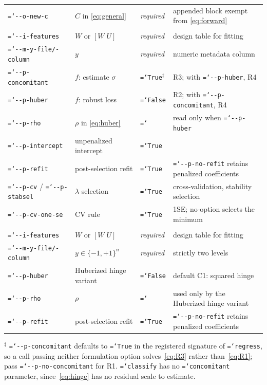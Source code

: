 \documentclass[11pt,a4paper]{article}
\newcommand{\code}[1]{\allowbreak\texttt{\hyphenchar\font=`\-\relax #1}}
\begin{document}
\begin{table}[htbp]
\begin{tabular}{@{}llll@{}}
\code{-{}-o-new-c} & $C$ in \eqref{eq:general} & \textit{required} & appended block exempt from \eqref{eq:forward} \\
\addlinespace
\multicolumn{4}{@{}l}{\textit{\code{classo regress}}} \\
\code{-{}-i-features} & $W$ or $[W\;U]$ & \textit{required} & design table for fitting \\
\code{-{}-m-y-file/-column} & $y$ & \textit{required} & numeric metadata column \\
\code{-{}-p-concomitant} & $f$: estimate $\sigma$ & \code{True}$^{\ddagger}$ & R3; with \code{-{}-p-huber}, R4 \\
\code{-{}-p-huber} & $f$: robust loss & \code{False} & R2; with \code{-{}-p-concomitant}, R4 \\
\code{-{}-p-rho} & $\rho$ in \eqref{eq:huber} & \code{1.345} & read only when \code{-{}-p-huber} \\
\code{-{}-p-intercept} & unpenalized intercept & \code{True} & \\
\code{-{}-p-refit} & post-selection refit & \code{True} & \code{-{}-p-no-refit} retains penalized coefficients \\
\code{-{}-p-cv} / \code{-{}-p-stabsel} & $\lambda$ selection & \code{True} & cross-validation, stability selection \\
\code{-{}-p-cv-one-se} & CV rule & \code{True} & 1SE; no-option selects the minimum \\
\addlinespace
\multicolumn{4}{@{}l}{\textit{\code{classo classify}}} \\
\code{-{}-i-features} & $W$ or $[W\;U]$ & \textit{required} & design table for fitting \\
\code{-{}-m-y-file/-column} & $y \in \{-1,+1\}^{n}$ & \textit{required} & strictly two levels \\
\code{-{}-p-huber} & Huberized hinge variant & \code{False} & default C1: squared hinge \\
\code{-{}-p-rho} & $\rho$ & \code{0.0} & used only by the Huberized hinge variant \\
\code{-{}-p-refit} & post-selection refit & \code{True} & \code{-{}-p-no-refit} retains penalized coefficients \\
\bottomrule
\end{tabular}

\vspace{0.4em}
\begin{minipage}{\textwidth}\small
$^{\ddagger}$ \code{-{}-p-concomitant} defaults to \code{True} in the registered
signature of \code{regress}, so a call passing neither formulation option
solves~\eqref{eq:R3} rather than~\eqref{eq:R1}; pass
\code{-{}-p-no-concomitant} for R1. \code{classify} has no \code{concomitant}
parameter, since~\eqref{eq:hinge} has no residual scale to estimate.
\end{minipage}
\end{table}
\end{document}
